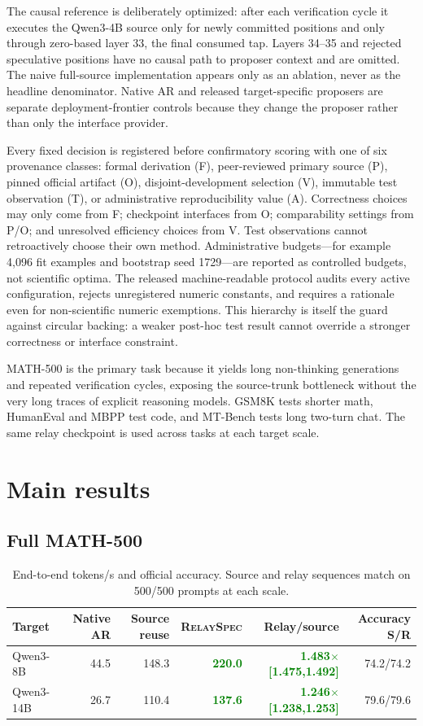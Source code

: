 \documentclass[10pt]{article}
\newcommand{\method}{\textsc{RelaySpec}}
\newcommand{\good}[1]{\textbf{\textcolor{green}{#1}}}
\begin{document}
The causal reference is deliberately optimized: after each verification cycle
it executes the Qwen3-4B source only for newly committed positions and only
through zero-based layer 33, the final consumed tap. Layers 34--35 and rejected
speculative positions have no causal path to proposer context and are omitted.
The naive full-source implementation appears only as an ablation, never as the
headline denominator. Native AR and released target-specific proposers are
separate deployment-frontier controls because they change the proposer rather
than only the interface provider.

Every fixed decision is registered before confirmatory scoring with one of six
provenance classes: formal derivation (F), peer-reviewed primary source (P),
pinned official artifact (O), disjoint-development selection (V), immutable
test observation (T), or administrative reproducibility value (A). Correctness
choices may only come from F; checkpoint interfaces from O; comparability
settings from P/O; and unresolved efficiency choices from V. Test observations
cannot retroactively choose their own method. Administrative budgets---for
example 4,096 fit examples and bootstrap seed 1729---are reported as controlled
budgets, not scientific optima. The released machine-readable protocol audits
every active configuration, rejects unregistered numeric constants, and
requires a rationale even for non-scientific numeric exemptions. This
hierarchy is itself the guard against circular backing: a weaker post-hoc test
result cannot override a stronger correctness or interface constraint.

MATH-500 is the primary task because it yields long non-thinking generations
and repeated verification cycles, exposing the source-trunk bottleneck without
the very long traces of explicit reasoning models. GSM8K tests shorter math,
HumanEval and MBPP test code, and MT-Bench tests long two-turn chat. The same
relay checkpoint is used across tasks at each target scale.

\section{Main results}

\subsection{Full MATH-500}

\begin{table}[H]
\centering
\small
\begin{tabular}{@{}lrrrrr@{}}
\toprule
Target & Native AR & Source reuse & \method{} & Relay/source & Accuracy S/R \\
\midrule
Qwen3-8B & 44.5 & 148.3 & \good{220.0} & \good{1.483$\times$ [1.475,1.492]} & 74.2/74.2 \\
Qwen3-14B & 26.7 & 110.4 & \good{137.6} & \good{1.246$\times$ [1.238,1.253]} & 79.6/79.6 \\
\bottomrule
\end{tabular}
\caption{End-to-end tokens/s and official accuracy. Source and relay sequences
match on 500/500 prompts at each scale.}
\end{table}
\end{document}
